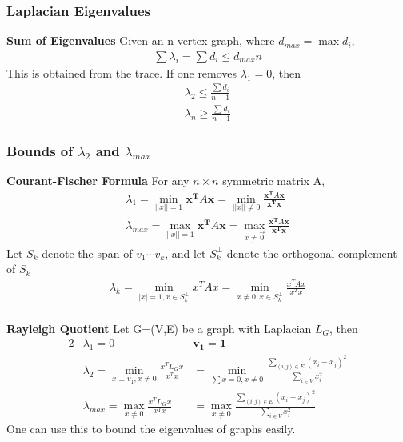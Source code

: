 \documentclass[12pt, letterpaper]{report}
\begin{document}
    \subsubsection{Laplacian Eigenvalues}
    \textbf{Sum of Eigenvalues} Given an n-vertex graph, where $d_{max} = \max{d_i}$, 
    \begin{gather*}
        \sum{\lambda_i}=\sum{d_i} \leq d_{max} n
    \end{gather*}
    This is obtained from the trace. If one removes $\lambda_1=0$, then
    \begin{gather*}
        \lambda_2 \leq \frac{\sum{d_i}}{n-1}\\
        \lambda_n \geq \frac{\sum{d_i}}{n-1}
    \end{gather*}
    
    \subsubsection{Bounds of $\lambda_2$ and $\lambda_{max}$}
    \textbf{Courant-Fischer Formula} For any $n\times n$ symmetric matrix A,
    \begin{gather*}
        \lambda_{1} = \min_{||x||=1} \mathbf{x^T}A\mathbf{x} = \min_{||x||\neq 0}\frac{\mathbf{x^T}A\mathbf{x}}{\mathbf{x^Tx}}\\
        \lambda_{max} = \max_{||x||=1}{\mathbf{x^T}A\mathbf{x}} = \max_{x\neq \vec{0}}\frac{\mathbf{x^T}A\mathbf{x}}{\mathbf{x^Tx}}
    \end{gather*}
    Let $S_k$ denote the span of $v_1 \cdots v_k$, and let $S_k^\perp$ denote the orthogonal complement of $S_k$
    \begin{gather*}
        \lambda_k = \min_{|x|=1,x\in S_k^\perp}x^TAx=\min_{x\neq 0,x\in S_k^\perp}\frac{x^TAx}{x^Tx}
    \end{gather*}
    \\
    \textbf{Rayleigh Quotient}
    Let G=(V,E) be a graph with Laplacian $L_{G}$, then
    \begin{alignat*}{2}
        &\lambda_1 = 0 & \mathbf{v_1} = \mathbf{1}\\
        &\lambda_2 = \min_{x\perp v_1,x\neq 0}\frac{x^T L_G x}{x^Tx} &=\min_{\sum x=0,x\neq 0} \frac{\sum_{(i,j)\in E}(x_i-x_j)^2}{\sum_{i \in V}x_i^2}\\
        &\lambda_{max} = \max_{x\neq 0}\frac{x^T L_G x}{x^Tx} &=\max_{x\neq 0} \frac{\sum_{(i,j)\in E}(x_i-x_j)^2}{\sum_{i \in V}x_i^2}
    \end{alignat*}
    One can use this to bound the eigenvalues of graphs easily.
\end{document}

